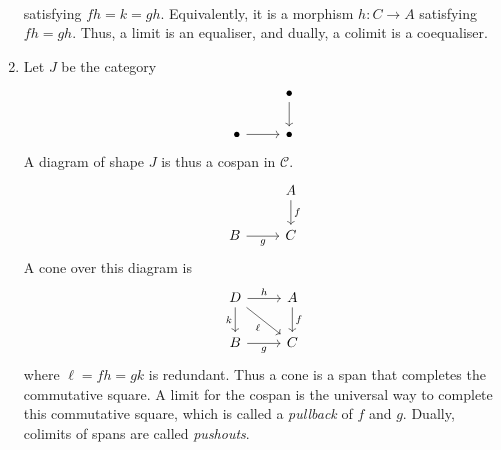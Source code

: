 \begin{example}
\begin{enumerate}
\[\begin{tikzcd}
\end{tikzcd}\]
        satisfying \( fh = k = gh \).
        Equivalently, it is a morphism \( h : C \to A \) satisfying \( fh = gh \).
        Thus, a limit is an equaliser, and dually, a colimit is a coequaliser.
        \item Let \( J \) be the category
\[\begin{tikzcd}
	& \bullet \\
	\bullet & \bullet
	\arrow[from=1-2, to=2-2]
	\arrow[from=2-1, to=2-2]
\end{tikzcd}\]
        A diagram of shape \( J \) is thus a cospan in \( \mathcal C \).
\[\begin{tikzcd}
	& A \\
	B & C
	\arrow["f", from=1-2, to=2-2]
	\arrow["g"', from=2-1, to=2-2]
\end{tikzcd}\]
        A cone over this diagram is
\[\begin{tikzcd}
	D & A \\
	B & C
	\arrow["f", from=1-2, to=2-2]
	\arrow["g"', from=2-1, to=2-2]
	\arrow["h", from=1-1, to=1-2]
	\arrow["\ell"', from=1-1, to=2-2]
	\arrow["k"', from=1-1, to=2-1]
\end{tikzcd}\]
        where \( \ell = fh = gk \) is redundant.
        Thus a cone is a span that completes the commutative square.
        A limit for the cospan is the universal way to complete this commutative square, which is called a \emph{pullback} of \( f \) and \( g \).
        Dually, colimits of spans are called \emph{pushouts}.


\end{enumerate}
\end{example}
